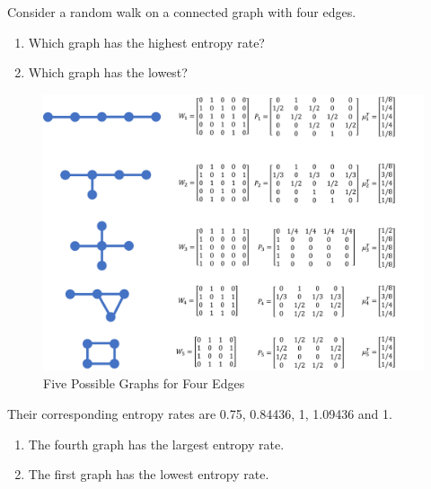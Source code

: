 \begin{exercise}{Consider a random walk on a connected graph with four edges.
  \begin{enumerate}
    \item Which graph has the highest entropy rate?
    \item Which graph has the lowest?
  \end{enumerate}}
\begin{solution}
      \begin{figure}[htbp]
        \centering
        \includegraphics[width=16cm]{img/4-1.png}
        \caption{Five Possible Graphs for Four Edges}
        \label{fig:ex11}
      \end{figure}

      Their corresponding entropy rates are 0.75, 0.84436, 1, 1.09436 and 1.
  \begin{enumerate}
    \item {
    The fourth graph has the largest entropy rate.
    }
    \item { The first graph has the lowest entropy rate.
    }
  \end{enumerate}
  \end{solution}
  \label{ex4-11}
\end{exercise}
